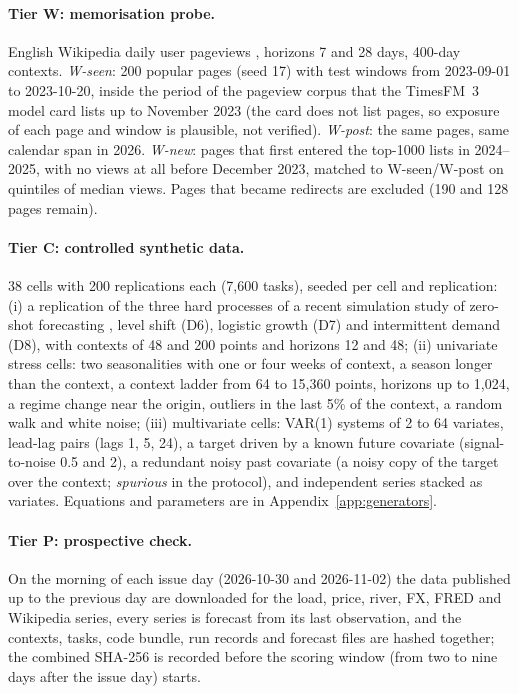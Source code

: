 \paragraph{Tier W: memorisation probe.} English Wikipedia daily user pageviews \citep{wikimedia2026pageviews}, horizons 7 and 28 days,
400-day contexts. \emph{W-seen}: 200 popular pages (seed 17) with test windows from 2023-09-01 to 2023-10-20, inside the period of the
pageview corpus that the TimesFM~3 model card lists up to November 2023 \citep{timesfm2026hf} (the card does not list pages, so
exposure of each page and window is plausible, not verified). \emph{W-post}: the same pages, same calendar span in
2026. \emph{W-new}: pages that first entered the top-1000 lists in 2024--2025, with no views at all before December 2023, matched to
W-seen/W-post on quintiles of median views. Pages that became redirects are excluded (190 and 128 pages remain).

\paragraph{Tier C: controlled synthetic data.} 38 cells with 200 replications each (7{,}600 tasks), seeded per cell and
replication: (i) a replication of the three hard processes of a recent simulation study of zero-shot forecasting
\citep{ebrahim2026foundation}, level shift (D6), logistic growth (D7) and intermittent demand (D8), with contexts of 48 and 200 points and
horizons 12 and 48; (ii) univariate stress cells: two seasonalities with one or four weeks of context, a season longer than the
context, a context ladder from 64 to 15{,}360 points, horizons up to 1{,}024, a regime change near the origin, outliers in the last
5\% of the context, a random walk and white noise; (iii) multivariate cells: VAR(1) systems of 2 to 64 variates, lead-lag pairs
(lags 1, 5, 24), a target driven by a known future covariate (signal-to-noise 0.5 and 2), a redundant noisy past covariate (a noisy copy of the target over the context; \emph{spurious} in the protocol), and independent
series stacked as variates. Equations and parameters are in Appendix~\ref{app:generators}.

\paragraph{Tier P: prospective check.} On the morning of each issue day (2026-10-30 and 2026-11-02) the data published up to the
previous day are downloaded for the load, price, river, FX, FRED and Wikipedia series, every series is forecast from its last
observation, and the contexts, tasks, code bundle, run records and forecast files are hashed together; the combined SHA-256 is
recorded before the scoring window (from two to nine days after the issue day) starts.

